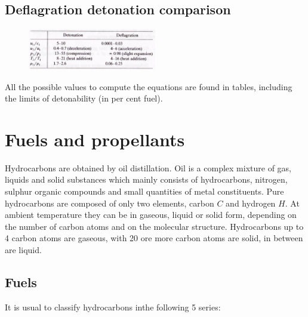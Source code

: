 \documentclass[12pt]{article}
\begin{document}
\subsection{Deflagration detonation comparison}

\begin{figure}[h!]
\centering
\includegraphics[width=0.5\textwidth]{figures/defla.png}
\end{figure}

All the possible values to compute the equations are found in tables, including the limits of detonability (in per cent fuel).

\newpage

\section{Fuels and propellants}

Hydrocarbons are obtained by oil distillation. Oil is a complex mixture of gas, liquids and solid substances which mainly consists of hydrocarbons, nitrogen, sulphur organic compounds and small quantities of metal constituents. Pure hydrocarbons are composed of only two elements, carbon $C$ and hydrogen $H$. At ambient temperature they can be in gaseous, liquid or solid form, depending on the number of carbon atoms and on the molecular structure. Hydrocarbons up to 4 carbon atoms are gaseous, with 20 ore more carbon atoms are solid, in between are liquid.

\subsection{Fuels}

It is usual to classify hydrocarbons inthe following 5 series:
\end{document}
